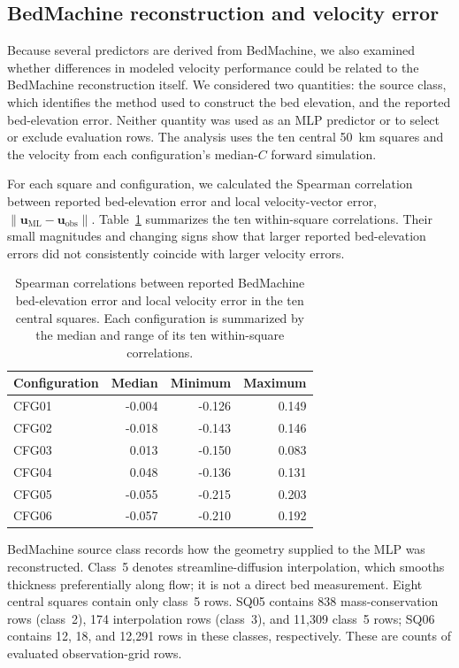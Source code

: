 \documentclass[review,jog]{igs}
\begin{document}
\subsection{BedMachine reconstruction and velocity error}
\label{app:bedmachine_diagnostics}

Because several predictors are derived from BedMachine, we also examined whether differences in modeled velocity performance could be related to the BedMachine reconstruction itself. We considered two quantities: the source
class, which identifies the method used to construct the bed elevation, and
the reported bed-elevation error. Neither quantity was used as an MLP
predictor or to select or exclude evaluation rows. The analysis uses the ten
central 50~km squares and the velocity from each configuration's median-$C$
forward simulation.

For each square and configuration, we calculated the Spearman
correlation between reported bed-elevation error and local
velocity-vector error,
$\lVert\mathbf{u}_{\mathrm{ML}}-\mathbf{u}_{\mathrm{obs}}\rVert$.
Table~\ref{tab:bedmachine_error_correlations} summarizes the ten
within-square correlations. Their small magnitudes and changing signs
show that larger reported bed-elevation errors did not consistently
coincide with larger velocity errors.

\begin{table}
\centering
\caption{Spearman correlations between reported BedMachine
bed-elevation error and local velocity error in the ten central
squares. Each configuration is summarized by the median and range
of its ten within-square correlations.}
\label{tab:bedmachine_error_correlations}
\begin{tabular}{lrrr}
\hline
Configuration & Median & Minimum & Maximum \\
\hline
CFG01 & -0.004 & -0.126 & 0.149 \\
CFG02 & -0.018 & -0.143 & 0.146 \\
CFG03 &  0.013 & -0.150 & 0.083 \\
CFG04 &  0.048 & -0.136 & 0.131 \\
CFG05 & -0.055 & -0.215 & 0.203 \\
CFG06 & -0.057 & -0.210 & 0.192 \\
\hline
\end{tabular}
\end{table}

BedMachine source class records how the geometry supplied to the MLP
was reconstructed. Class~5 denotes streamline-diffusion interpolation,
which smooths thickness preferentially along flow; it is not a direct
bed measurement. Eight central squares contain only class~5 rows.
SQ05 contains 838 mass-conservation rows (class~2), 174 interpolation
rows (class~3), and 11,309 class~5 rows; SQ06 contains 12, 18,
and 12,291 rows in these classes, respectively. These are counts of
evaluated observation-grid rows.
\end{document}
